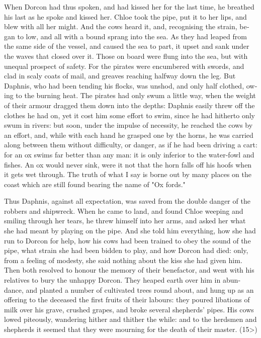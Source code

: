 \documentclass{book}
\begin{document}
\begin{pairs}
\begin{Rightside}
\begin{english}
  When Dorcon had thus spoken, and had kissed her for the last time, he breathed his last as he spoke and kissed her.  Chloe took the pipe, put it to her lips, and blew with all her might.  And the cows heard it, and, recognising the strain, began to low, and all with a bound sprang into the sea.  As they had leaped from the same side of the vessel, and caused the sea to part, it upset and sank under the waves that closed over it.  Those on board were flung into the sea, but with unequal prospect of safety.  For the pirates were encumbered with swords, and clad in scaly coats of mail, and greaves reaching halfway down the leg.  But Daphnis, who had been tending his flocks, was unshod, and only half clothed, owing to the burning heat.  The pirates had only swum a little way, when the weight of their armour dragged them down into the depths: Daphnis easily threw off the clothes he had on, yet it cost him some effort to swim, since he had hitherto only swum in rivers: but soon, under the impulse of necessity, he reached the cows by an effort, and, while with each hand he grasped one by the horns, he was carried along between them without difficulty, or danger, as if he had been driving a cart: for an ox swims far better than any man: it is only inferior to the water-fowl and fishes.  An ox would never sink, were it not that the horn falls off his hoofs when it gets wet through.  The truth of what I say is borne out by many places on the coast which are still found bearing the name of "Ox fords."
\pend


  Thus Daphnis, against all expectation, was saved from the double danger of the robbers and shipwreck.  When he came to land, and found Chloe weeping and smiling through her tears, he threw himself into her arms, and asked her what she had meant by playing on the pipe.  And she told him everything, how she had run to Dorcon for help, how his cows had been trained to obey the sound of the pipe, what strain she had been bidden to play, and how Dorcon had died: only, from a feeling of modesty, she said nothing about the kiss she had given him.  Then both resolved to honour the memory of their benefactor, and went with his relatives to bury the unhappy Dorcon.  They heaped earth over him in abundance, and planted a number of cultivated trees round about, and hung up as an offering to the deceased the first fruits of their labours: they poured libations of milk over his grave, crushed grapes, and broke several shepherds' pipes.  His cows lowed piteously, wandering hither and thither the while: and to the herdsmen and shepherds it seemed that they were mourning for the death of their master.  (15>)
\pend



\end{english}
\end{Rightside}
\end{pairs}
\end{document}
